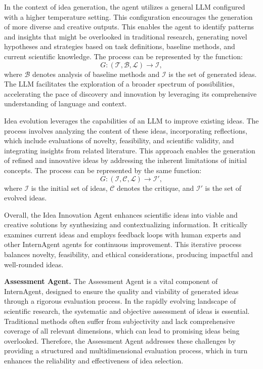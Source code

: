 In the context of idea generation, the agent utilizes a general LLM configured with a higher temperature setting. This configuration encourages the generation of more diverse and creative outputs. This enables the agent to identify patterns and insights that might be overlooked in traditional research, generating novel hypotheses and strategies based on task definitions, baseline methods, and current scientific knowledge. The process can be represented by the function:
\begin{equation}
    G: (\mathcal{T}, \mathcal{B}, \mathcal{L}) \rightarrow \mathcal{I},
\end{equation}
where $\mathcal{B}$ denotes analysis of baseline methods and $\mathcal{I}$ is the set of generated ideas. The LLM facilitates the exploration of a broader spectrum of possibilities, accelerating the pace of discovery and innovation by leveraging its comprehensive understanding of language and context.

Idea evolution leverages the capabilities of an LLM to improve existing ideas. The process involves analyzing the content of these ideas, incorporating reflections, which include evaluations of novelty, feasibility, and scientific validity, and integrating insights from related literature. This approach enables the generation of refined and innovative ideas by addressing the inherent limitations of initial concepts. The process can be represented by the same function:
\begin{equation}
    G: (\mathcal{I}, \mathcal{C}, \mathcal{L}) \rightarrow \mathcal{I}',
\end{equation}
where $\mathcal{I}$ is the initial set of ideas, $\mathcal{C}$ denotes the critique, and $\mathcal{I}'$ is the set of evolved ideas. 

Overall, the Idea Innovation Agent enhances scientific ideas into viable and creative solutions by synthesizing and contextualizing information. It critically examines current ideas and employs feedback loops with human experts and other InternAgent agents for continuous improvement. This iterative process balances novelty, feasibility, and ethical considerations, producing impactful and well-rounded ideas.

\noindent \textbf{Assessment Agent.}
\label{sec:assessment_agent}
The Assessment Agent is a vital component of InternAgent, designed to ensure the quality and viability of generated ideas through a rigorous evaluation process. In the rapidly evolving landscape of scientific research, the systematic and objective assessment of ideas is essential. Traditional methods often suffer from subjectivity and lack comprehensive coverage of all relevant dimensions, which can lead to promising ideas being overlooked\citep{qiu2025ai, si2024can}. Therefore, the Assessment Agent addresses these challenges by providing a structured and multidimensional evaluation process, which in turn enhances the reliability and effectiveness of idea selection.

